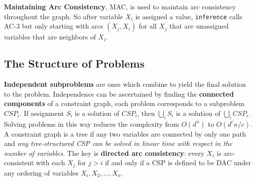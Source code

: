 \documentclass[twoside]{article}
\begin{document}
 \textbf{Maintaining Arc Consistency}, MAC, is used to maintain arc consistency
 throughout the graph. So after variable \(X_i\) is assigned a value, 
 \texttt{inference} calls AC-3 but only starting with arcs \((X_j, X_i)\) for
 all \(X_j\) that are unassigned variables that are neighbors of \(X_i\).
 \subsection{The Structure of Problems}
 \textbf{Independent subproblems} are ones which combine to yield the final
 solution to the problem. Independence can be ascertained by finding the
 \textbf{connected components} of a constraint graph, each problem corresponds
 to a subproblem \(CSP_i\). If assignment \(S_i\) is a solution of \(CSP_i\),
 then \(\bigcup _iS_i\) is a solution of \(\bigcup _iCSP_i\). Solving problems
 in this way reduces the complexity from \(O(d^n)\) to \(O(d^cn/c)\). A 
 constraint graph is a tree if any two variables are connected by only one
 path and \emph{any tree-structured CSP can be solved in linear time with
 respect in the number of variables}. The key is \textbf{directed arc consistency}:
every \(X_i\) is arc-consistent with each \(X_j\) for \(j > i\) if and only if
a CSP is defined to be DAC under any ordering of variables \(X_i, X_2,...,X_n\).\\
\end{document}
